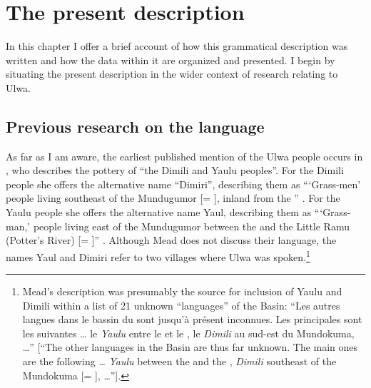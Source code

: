 \chapter{The present description}\label{sec:pres}

In this chapter I offer a brief account of how this grammatical description was written and how the data within it are organized and presented. I begin by situating the present description in the wider context of research relating to Ulwa.

\section{Previous research on the language}\label{sec:1.1}

As far as I am aware, the earliest published mention of the Ulwa people occurs in \citet[199]{Mead1938}, who describes the pottery of “the Dimili and Yaulu peoples”. For the Dimili people she offers the alternative name “Dimiri”, describing them as “‘Grass-men’ people living southeast of the Mundugumor [= ], inland from the ” \citep[347]{Mead1938}. For the Yaulu people she offers the alternative name Yaul, describing them as “‘Grass-man,’ people living east of the Mundugumor between the  and the Little Ramu (Potter’s River) [= ]” \citep[349]{Mead1938}. Although Mead does not discuss their language, the names Yaul and Dimiri refer to two villages where Ulwa was spoken.\footnote{Mead’s description was presumably the source for  inclusion of Yaulu and Dimili within a list of 21 unknown “languages” of the  Basin: “Les autres langues dans le bassin du  sont jusqu’à présent inconnues. Les principales sont les suivantes … le \textit{Yaulu} entre le  et le , le \textit{Dimili} au sud-est du Mundokuma, …” [“The other languages in the  Basin are thus far unknown. The main ones are the following … \textit{Yaulu} between the  and the , \textit{Dimili} southeast of the Mundokuma [= ], …”].}

